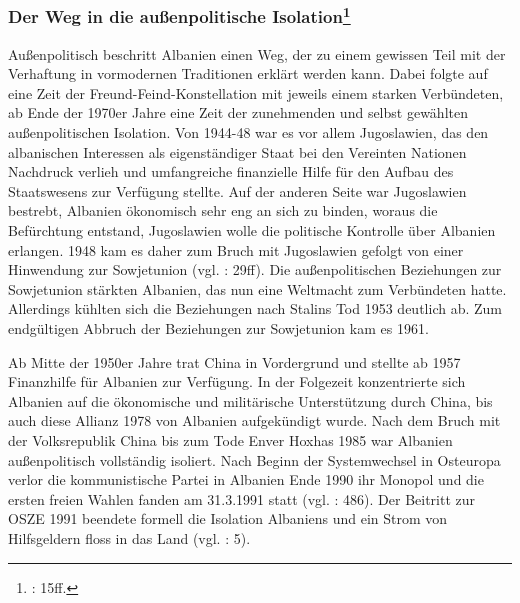 \subsubsection[Der Weg in die außenpolitische Isolation]{Der Weg in die außenpolitische Isolation\footnote{\cite{vollmer07}: 15ff.}}

Außenpolitisch beschritt Albanien einen Weg, der zu einem gewissen Teil mit der Verhaftung in vormodernen Traditionen erklärt werden kann. Dabei folgte auf eine Zeit der Freund-Feind-Konstellation mit jeweils einem starken Verbündeten, ab Ende der 1970er Jahre eine Zeit der zunehmenden und selbst gewählten außenpolitischen Isolation. Von 1944-48 war es vor allem Jugoslawien, das den albanischen Interessen als eigenständiger Staat bei den Vereinten Nationen Nachdruck verlieh und umfangreiche finanzielle Hilfe für den Aufbau des Staatswesens zur Verfügung stellte. Auf der anderen Seite war Jugoslawien bestrebt, Albanien ökonomisch sehr eng an sich zu binden, woraus die Befürchtung entstand, Jugoslawien wolle die politische Kontrolle über Albanien erlangen. 1948 kam es daher zum Bruch mit Jugoslawien gefolgt von einer Hinwendung zur Sowjetunion (vgl. \cite{odonnell}: 29ff). Die außenpolitischen Beziehungen zur Sowjetunion stärkten Albanien, das nun eine Weltmacht zum Verbündeten hatte. Allerdings kühlten sich die Beziehungen nach Stalins Tod 1953 deutlich ab. Zum endgültigen Abbruch der Beziehungen zur Sowjetunion kam es 1961.\par
Ab Mitte der 1950er Jahre trat China in Vordergrund und stellte ab 1957 Finanzhilfe für Albanien zur Verfügung. In der Folgezeit konzentrierte sich Albanien auf die ökonomische und militärische Unterstützung durch China, bis auch diese Allianz 1978 von Albanien aufgekündigt wurde. Nach dem Bruch mit der Volksrepublik China bis zum Tode Enver Hoxhas 1985 war Albanien außenpolitisch vollständig isoliert. Nach Beginn der Systemwechsel in Osteuropa verlor die kommunistische Partei in Albanien Ende 1990 ihr Monopol und die ersten freien Wahlen fanden am 31.3.1991 statt (vgl. \cite{ammann}: 486). Der Beitritt zur OSZE 1991 beendete formell die Isolation Albaniens und ein Strom von Hilfsgeldern floss in das Land (vgl. \cite{deza}: 5).\par
